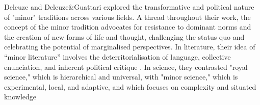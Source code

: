         Deleuze and Deleuze\&Guattari explored the transformative and political nature of "minor" traditions across various fields. A thread throughout their work, the concept of the minor tradition advocates for resistance to dominant norms and the creation of new forms of life and thought, challenging the status quo and celebrating the potential of marginalised perspectives. In literature, their idea of “minor literature” involves the deterritorialisation of language, collective enunciation, and inherent political critique \citep{DeleuzeGuattariKafka1986} . In science, they contrasted "royal science," which is hierarchical and universal, with "minor science," which is experimental, local, and adaptive, and which focuses on complexity and situated knowledge\postnote{
                
            \begin{quote}

\end{quote}}
